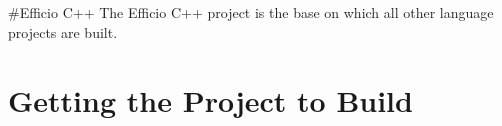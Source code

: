 \#\+Efficio C++ The Efficio C++ project is the base on which all other language projects are built.

\section*{Getting the Project to Build }


\begin{DoxyEnumerate}
\item 
\end{DoxyEnumerate}